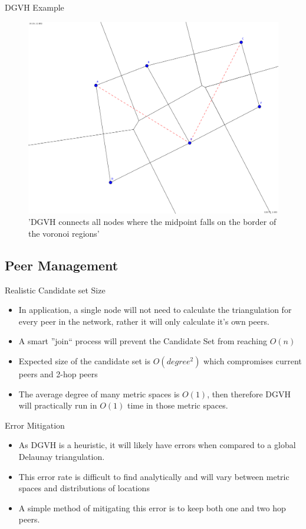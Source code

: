 \documentclass[8pt]{beamer}
\begin{document}
	
	
\begin{frame}{DGVH Example}
	\begin{figure}
	\centering
	\includegraphics[width=0.5\linewidth]{DGVH}
	\caption{'DGVH connects all nodes where the midpoint falls on the border of the voronoi regions'}
	\label{delaunay}
\end{figure}
	\end{frame}
	
	
	
	
\subsection{Peer Management}
	\begin{frame}{Realistic Candidate set Size}
		\begin{itemize}
			\item In application, a single node will not need to calculate the triangulation for every peer in the network, rather it will only calculate it's own peers.
			\item A smart ''join`` process will prevent the Candidate Set from reaching $O(n)$
			\item Expected size of the candidate set is $O(degree^2)$ which compromises current peers and 2-hop peers
			\item The average degree of many metric spaces is $O(1)$, then therefore DGVH will practically run in $O(1)$ time in those metric spaces.
		\end{itemize}
	\end{frame}
	\begin{frame}{Error Mitigation}
		\begin{itemize}
			\item As DGVH is a heuristic, it will likely have errors when compared to a global Delaunay triangulation.
			\item This error rate is difficult to find analytically and will vary between metric spaces and distributions of locations
			\item A simple method of mitigating this error is to keep both one and two hop peers.
		\end{itemize}
	\end{frame}
	
\end{document}
